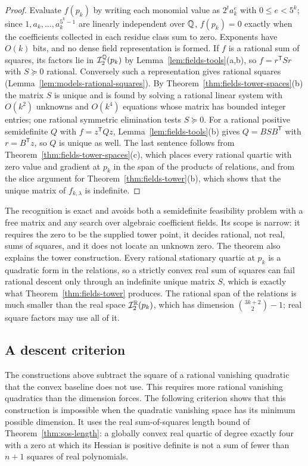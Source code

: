 \begin{proof}
Evaluate $f(p_k)$ by writing each monomial value as $2^ta_k^e$ with
$0\le e<5^k$; since $1,a_k,\ldots,a_k^{5^k-1}$ are linearly independent over
$\mathbb Q$, $f(p_k)=0$ exactly when the coefficients collected in each residue
class sum to zero. Exponents have $O(k)$ bits, and no dense field
representation is formed. If $f$ is a rational sum of squares, its factors
lie in $\mathcal I_2^\mathbb Q(p_k)$ by Lemma~\ref{lem:fields-tools}(a,b), so
$f=r^{\mathsf T}Sr$ with $S\succeq0$ rational. Conversely such a
representation gives rational squares (Lemma~\ref{lem:models-rational-squares}).
By Theorem~\ref{thm:fields-tower-spaces}(b) the matrix $S$ is unique and is
found by solving a rational linear system with $O(k^2)$ unknowns and $O(k^4)$
equations whose matrix has bounded integer entries; one rational symmetric
elimination tests $S\succeq0$. For a rational positive semidefinite $Q$ with
$f=z^{\mathsf T}Qz$, Lemma~\ref{lem:fields-tools}(b) gives
$Q=BSB^{\mathsf T}$ with $r=B^{\mathsf T}z$, so $Q$ is unique as well. The
last sentence follows from Theorem~\ref{thm:fields-tower-spaces}(c), which
places every rational quartic with zero value and gradient at $p_k$ in the
span of the products of relations, and from the slice argument for
Theorem~\ref{thm:fields-tower}(b), which shows that the unique matrix of
$f_{k,\lambda}$ is indefinite.
\end{proof}

The recognition is exact and avoids both a semidefinite feasibility problem
with a free matrix and any search over algebraic coefficient fields. Its
scope is narrow: it requires the zero to be the supplied tower point, it
decides rational, not real, sums of squares, and it does not locate an
unknown zero. The theorem also explains the tower construction. Every
rational stationary quartic at $p_k$ is a quadratic form in the relations,
so a strictly convex real sum of squares can fail rational descent only
through an indefinite unique matrix $S$, which is exactly what
Theorem~\ref{thm:fields-tower} produces. The rational span of the relations
is much smaller than the real space $\mathcal I_2^\mathbb R(p_k)$, which has
dimension $\binom{3k+2}2-1$; real square factors may use all of it.

\subsection{A descent criterion}
\label{sec:fields-criterion}

The constructions above subtract the square of a rational vanishing quadratic
that the convex baseline does not use. This requires more rational vanishing
quadratics than the dimension forces. The following criterion shows that
this construction is impossible when the quadratic vanishing space has its
minimum possible dimension. It uses the real sum-of-squares length bound of
Theorem~\ref{thm:sos-length}: a globally convex real quartic of degree
exactly four with a zero at which its Hessian is positive definite is not a
sum of fewer than $n+1$ squares of real polynomials.

